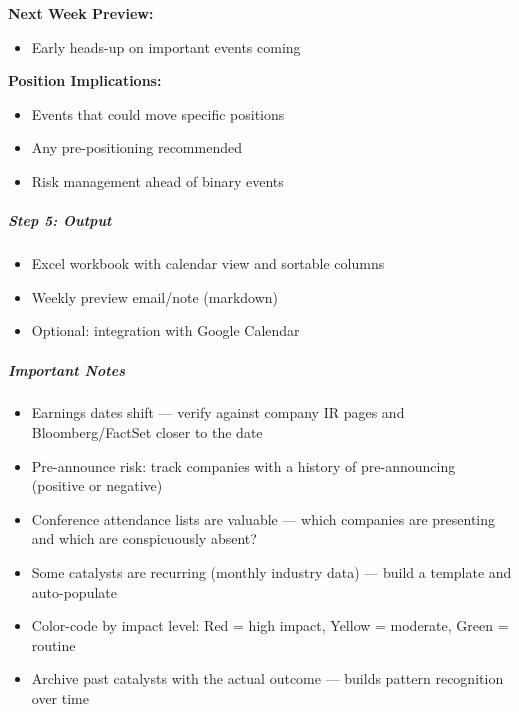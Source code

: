 \documentclass[11pt]{article}
\begin{document}
\textbf{Next Week Preview:}

\begin{itemize}[leftmargin=*,itemsep=2pt,topsep=2pt]
\item {} Early heads-up on important events coming
\end{itemize}

\textbf{Position Implications:}

\begin{itemize}[leftmargin=*,itemsep=2pt,topsep=2pt]
\item {} Events that could move specific positions
\item {} Any pre-positioning recommended
\item {} Risk management ahead of binary events
\end{itemize}

\subparagraph{Step 5: Output}\mbox{}\par

\begin{itemize}[leftmargin=*,itemsep=2pt,topsep=2pt]
\item {} Excel workbook with calendar view and sortable columns
\item {} Weekly preview email/note (markdown)
\item {} Optional: integration with Google Calendar
\end{itemize}

\subparagraph{Important Notes}\mbox{}\par

\begin{itemize}[leftmargin=*,itemsep=2pt,topsep=2pt]
\item {} Earnings dates shift — verify against company IR pages and Bloomberg/FactSet closer to the date
\item {} Pre-announce risk: track companies with a history of pre-announcing (positive or negative)
\item {} Conference attendance lists are valuable — which companies are presenting and which are conspicuously absent?
\item {} Some catalysts are recurring (monthly industry data) — build a template and auto-populate
\item {} Color-code by impact level: Red = high impact, Yellow = moderate, Green = routine
\item {} Archive past catalysts with the actual outcome — builds pattern recognition over time
\end{itemize}
\end{document}
